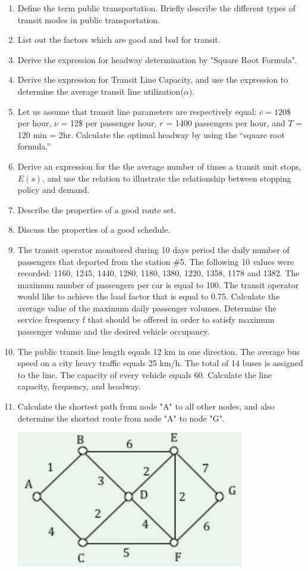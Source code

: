 \begin{enumerate}
	\item Define the term public transportation. Briefly describe the different types of transit modes in public transportation.
	\item List out the factors which are good and bad for transit.
	\item Derive the expression for headway determination by "Square Root Formula".
	\item Derive the expression for Transit Line Capacity, and use the expression to determine the average transit line utilization($\alpha$).
	\item Let us assume that transit line parameters are respectively equal: $ c = 120\$ $ per hour, $\nu$ = 12\$ per passenger hour, $r$ = 1400 passengers per hour, and $T$ = 120 min = 2hr. Calculate the optimal headway by using the “square root formula.”
	\item Derive an expression for the the average number of times a transit
	unit stops, $ E(s) $, and use the relation to illustrate the relationship between stopping policy and demand.
	\item Describe the properties of a good route set.
	\item Discuss the properties of a good schedule.
	\item The transit operator monitored during 10 days period the daily number of passengers that departed from the station \#5. The following 10 values were recorded: 1160, 1245, 1440, 1280, 1180, 1380, 1220, 1358, 1178 and 1382. The maximum number of passengers per car is equal to 100. The transit operator would like to achieve the load factor that is equal to 0.75. Calculate the average value of the maximum daily passenger volumes. Determine the service frequency f that should be offered in order to satisfy maximum passenger volume and the desired vehicle occupancy.
	\item The public transit line length equals 12 km in one direction. The average bus speed on a city heavy traffic equals 25 km/h. The total of 14 buses is assigned to the line. The capacity of every vehicle equals 60. Calculate the line capacity, frequency, and headway.
	\item Calculate the shortest path from node "A" to all other nodes, and also determine the shortest route from node "A" to node "G".
	\begin{center}
		\includegraphics{gfx/fig32.png}

\end{center}
\end{enumerate}
